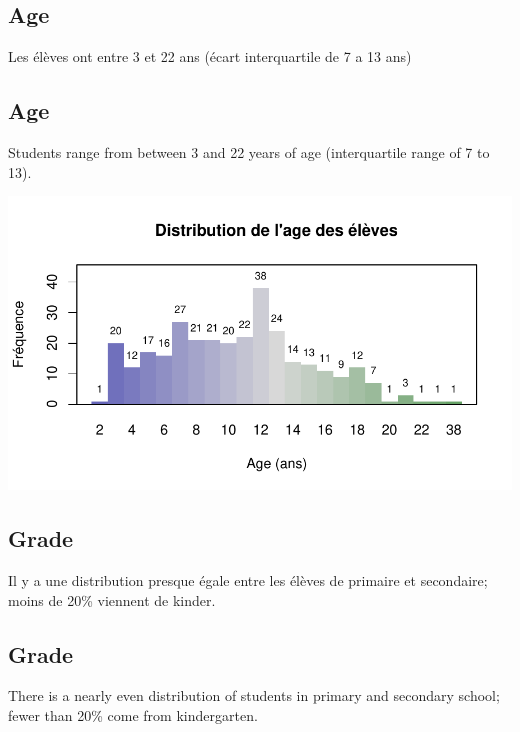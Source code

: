 \documentclass[11pt]{article}
\begin{document}
\newpage
\begin{multicols}{2} 


\subsection*{Age}
Les élèves ont entre 3 et 22 ans (écart interquartile de 7 a 13 ans)

\vfill
\columnbreak

\subsection*{Age}
Students range from between 3 and 22 years of age (interquartile range of 7 to 13).


\end{multicols}
\begin{center}
\includegraphics{chik_analyse_pour_madsen-004}
\end{center}
\begin{multicols}{2} 


\subsection*{Grade}
Il y a une distribution presque égale entre les élèves de primaire et secondaire; moins de 20\% viennent de kinder.  

\vfill
\columnbreak

\subsection*{Grade}
There is a nearly even distribution of students in primary and secondary school; fewer than 20\% come from kindergarten.

\end{multicols}
\end{document}
